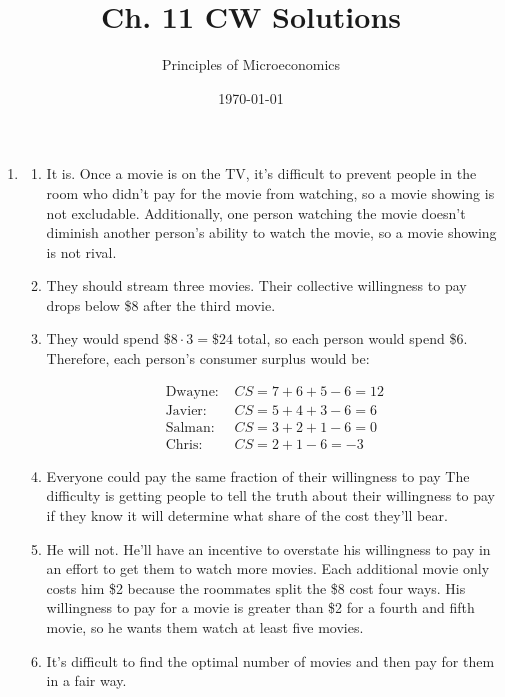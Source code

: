 \documentclass{article}
\title{Ch. 11 CW Solutions}
\author{Principles of Microeconomics}
\date{\today}
\begin{document}
\maketitle

\begin{enumerate}

\item

	\begin{enumerate}

	\item It is. Once a movie is on the TV, it's difficult to prevent people in the room who didn't pay for the movie from watching, so a movie showing is not excludable. Additionally, one person watching the movie doesn't diminish another person's ability to watch the movie, so a movie showing is not rival. 

	\item They should stream three movies. Their collective willingness to pay drops below \$8 after the third movie.
	
	\item They would spend $\$8 \cdot 3 = \$24$ total, so each person would spend \$6. Therefore, each person's consumer surplus would be:
	
		\begin{align*}
		\text{Dwayne: } &CS = 7 + 6 + 5 - 6 = 12 \\
		\text{Javier: } &CS = 5 + 4 + 3 -6 = 6 \\
		\text{Salman: } &CS = 3 + 2 + 1 - 6 = 0 \\
		\text{Chris: } &CS = 2 + 1 - 6 = -3
		\end{align*}
		
	\item Everyone could pay the same fraction of their willingness to pay The difficulty is getting people to tell the truth about their willingness to pay if they know it will determine what share of the cost they'll bear.
	
	\item He will not. He'll have an incentive to overstate his willingness to pay in an effort to get them to watch more movies. Each additional movie only costs him \$2 because the roommates split the \$8 cost four ways. His willingness to pay for a movie is greater than \$2 for a fourth and fifth movie, so he wants them watch at least five movies.
	
	\item It's difficult to find the optimal number of movies and then pay for them in a fair way.


\end{enumerate}
\end{enumerate}
\end{document}
